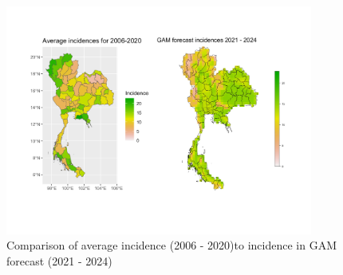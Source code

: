 \begin{figure}[hbpt]
	
	\includegraphics[width=0.9\textwidth]{fig/gam_vs_i.jpg}
	\caption{Comparison of average incidence (2006 - 2020)to incidence in GAM forecast (2021 - 2024)}
	\label{fig:gamvsimap}
	
\end{figure}

